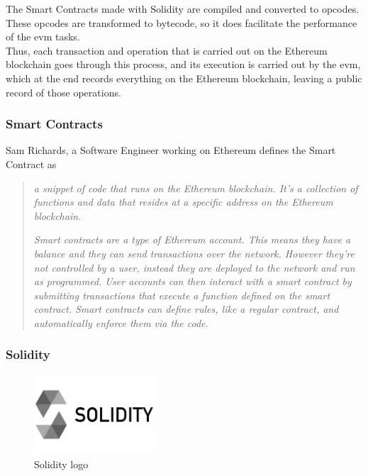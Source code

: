 The Smart Contracts made with Solidity are compiled and converted to opcodes. These opcodes are transformed to bytecode, so it does facilitate the performance of the \acrshort{evm} tasks.\\

Thus, each transaction and operation that is carried out on the Ethereum blockchain goes through this process, and its execution is carried out by the \acrshort{evm}, which at the end records everything on the Ethereum blockchain, leaving a public record of those operations.

\subsubsection{Smart Contracts}
Sam Richards\cite{smartContracts}, a Software Engineer working on Ethereum defines the Smart Contract as
\begin{quote}
    \textit{a snippet of code that runs on the Ethereum blockchain. It's a collection of functions and data that resides at a specific address on the Ethereum blockchain.}

    \textit{Smart contracts are a type of Ethereum account. This means they have a balance and they can send transactions over the network. However they're not controlled by a user, instead they are deployed to the network and run as programmed. User accounts can then interact with a smart contract by submitting transactions that execute a function defined on the smart contract. Smart contracts can define rules, like a regular contract, and automatically enforce them via the code.}
\end{quote}

\subsubsection{Solidity}
\begin{figure}[h]
    \centering
    \includegraphics[width=0.4\textwidth]{images/State of the Art/ethereum/solidity-logo.jpg}
    \caption{Solidity logo}
    \label{fig:solidity_logo}
\end{figure}

